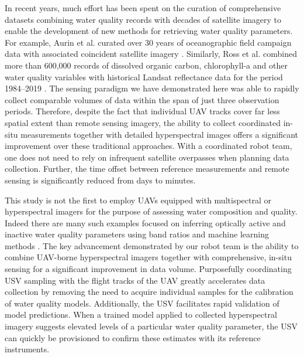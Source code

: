 \documentclass[remotesensing,article,submit,pdftex,moreauthors]{Definitions/mdpi}
\begin{document}
In recent years, much effort has been spent on the curation of comprehensive datasets combining water quality records with decades of satellite imagery to enable the development of new methods for retrieving water quality parameters. For example, Aurin et al. curated over 30 years of oceanographic field campaign data with associated coincident satellite imagery \cite{aurin2018remote}. Similarly, Ross et al. combined more than 600,000 records of dissolved organic carbon, chlorophyll-a and other water quality variables with historical Landsat reflectance data for the period 1984--2019 \cite{ross2019aquasat}. The sensing paradigm we have demonstrated here was able to rapidly collect comparable volumes of data within the span of just three observation periods. Therefore, despite the fact that individual UAV tracks cover far less spatial extent than remote sensing imagery, the ability to collect coordinated in-situ measurements together with detailed hyperspectral images offers a significant improvement over these traditional approaches. With a coordinated robot team, one does not need to rely on infrequent satellite overpasses when planning data collection. Further, the time offset between reference measurements and remote sensing is significantly reduced from days to minutes.

This study is not the first to employ UAVs equipped with multispectral or hyperspectral imagers for the purpose of assessing water composition and quality. Indeed there are many such examples focused on inferring optically active and inactive water quality parameters using band ratios and machine learning methods \cite{vogt2016near,lu2021retrieval, zhang2022selection}. The key advancement demonstrated by our robot team is the ability to combine UAV-borne hyperspectral imagers together with comprehensive, in-situ sensing for a significant improvement in data volume. Purposefully coordinating USV sampling with the flight tracks of the UAV greatly accelerates data collection by removing the need to acquire individual samples for the calibration of water quality models. Additionally, the USV facilitates rapid validation of model predictions. When a trained model applied to collected hyperspectral imagery suggests elevated levels of a particular water quality parameter, the USV can quickly be provisioned to confirm these estimates with its reference instruments. 
\end{document}
